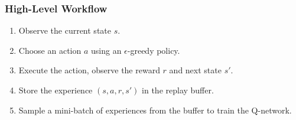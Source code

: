 \documentclass[11pt,a4paper]{article}
\begin{document}
    \subsubsection*{High-Level Workflow}
    \begin{enumerate}
        \item Observe the current state $s$.
        \item Choose an action $a$ using an $\epsilon$-greedy policy.
        \item Execute the action, observe the reward $r$ and next state $s'$.
        \item Store the experience $(s, a, r, s')$ in the replay buffer.
        \item Sample a mini-batch of experiences from the buffer to train the Q-network.
    \end{enumerate}
    
\end{document}
